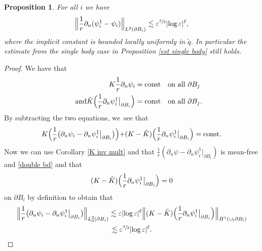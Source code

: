 \documentclass[JEP,XML,SOM,Unicode,published]{cedram}
\let\epsilon\varepsilon
\newcommand{\const}{\textup{const}}
\newtheorem{proposition}[theorem]{Proposition}
\theoremstyle{definition}
\newcommand\Bnorm[1]{\Bigl\lVert #1\Bigr\rVert}
\newcommand\eq{=}
\let\de\partial
\let\eps\epsilon
\begin{document}
\begin{proposition}\label{comp mult}
For all $i$ we have
\begin{align*}
\Bnorm{\frac{1}{r}\de_n(\psi_i^1-\psi_i)}_{L^2(\de B_i)}\lesssim \eps^{\sfrac{3}{2}}|{\log\eps}|^\ell,
\end{align*}
where the implicit constant is bounded locally uniformly in $\tilde{q}$.
In particular the estimate from the single body case in Proposition \ref{est single body} still holds.
\end{proposition}
\begin{proof}
We have that
\begin{align*}
K\frac{1}{r}\de_n\psi_i&\eq \const \quad\text{on all $\de B_j$}
\\
\tag*{and}
\tilde{K}\Bigl(\frac{1}{r}\de_n\psi_i^1\big|_{\de B_i}\Bigr)&\eq \const \quad\text{on all $\de B_j$}.
\end{align*}
By subtracting the two equations, we~see that
\begin{align*}
K\Bigl(\frac{1}{r}\bigl(\de_n\psi_i-\de_n\psi_i^1\big|_{\de B_i}\bigr)\Bigl)+(K-\tilde{K})\Bigl(\frac{1}{r}\de_n\psi_i^1\big|_{\de B_i}\Bigr)\eq \const.
\end{align*}
Now we can use Corollary \ref{K inv mult} and that $\frac{1}{r}(\de_n\psi-\de_n\psi_i^1\big|_{\de B_i})$ is mean-free and \eqref{double bd} and that
\begin{align*}(K-\tilde{K}) \Bigl(\frac{1}{r}\de_n\psi_i^1\big|_{\de B_i} \Bigr)\eq 0
\end{align*}
on $\de B_i$ by definition to obtain that
\begin{multline*}
\Bnorm{\frac{1}{r}\bigl(\de_n\psi_i-\de_n\psi_i^1\big|_{\de B_i}\bigr)}_{L_0^2(\de B_i)}\lesssim \eps|{\log\eps}|^\ell\Bnorm{(K-\tilde{K}) \Bigl(\frac{1}{r}\de_n\psi_i^1\big|_{\de B_i}\Bigr)}_{\dot{H}^1(\cup_l\de B_l)}\\
\lesssim \eps^{\sfrac{3}{2}}|{\log\eps}|^\ell.\qedhere
\end{multline*}
\end{proof}
\end{document}
